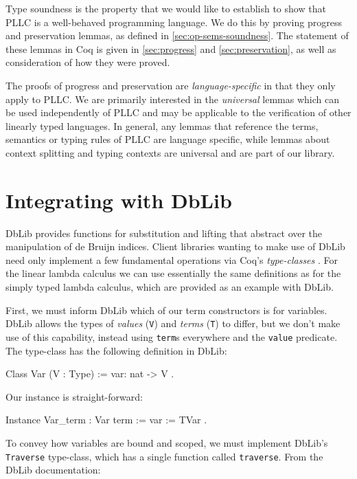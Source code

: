 \documentclass[]{unswthesis}
\let\c\texttt
\let\i\textit
\begin{document}
Type soundness is the property that we would like to establish to show that PLLC is a well-behaved programming language. We do this by proving progress and preservation lemmas, as defined in \cref{sec:op-sems-soundness}. The statement of these lemmas in Coq is given in \cref{sec:progress} and \cref{sec:preservation}, as well as consideration of how they were proved.

The proofs of progress and preservation are \i{language-specific} in that they only apply to PLLC. We are primarily interested in the \i{universal} lemmas which can be used independently of PLLC and may be applicable to the verification of other linearly typed languages. In general, any lemmas that reference the terms, semantics or typing rules of PLLC are language specific, while lemmas about context splitting and typing contexts are universal and are part of our library.

\section{Integrating with DbLib}
\label{sec:dblib-int}

DbLib provides functions for substitution and lifting that abstract over the manipulation of de Bruijn indices. Client libraries wanting to make use of DbLib need only implement a few fundamental operations via Coq's \i{type-classes} \cite{coqTypeClasses}. For the linear lambda calculus we can use essentially the same definitions as for the simply typed lambda calculus, which are provided as an example with DbLib.

First, we must inform DbLib which of our term constructors is for variables. DbLib allows the types of \i{values} (\c{V}) and \i{terms} (\c{T}) to differ, but we don't make use of this capability, instead using \c{term}s everywhere and the \c{value} predicate. The type-class has the following definition in DbLib:

\begin{coqcode}
Class Var (V : Type) := {
  var: nat -> V
}.
\end{coqcode}

Our instance is straight-forward:

\begin{coqcode}
Instance Var_term : Var term := {
  var := TVar
}.
\end{coqcode}

To convey how variables are bound and scoped, we must implement DbLib's \c{Traverse} type-class, which has a single function called \c{traverse}. From the DbLib documentation:
\end{document}
